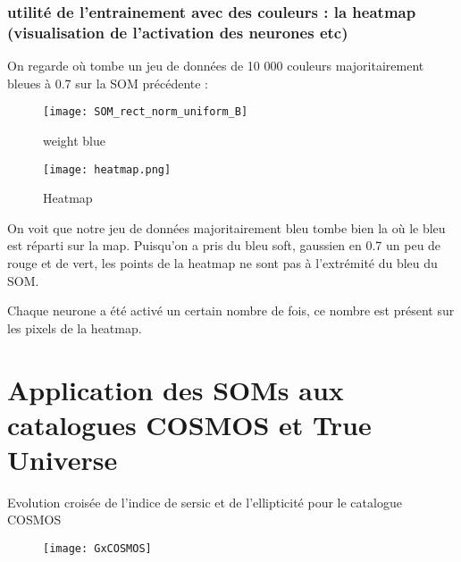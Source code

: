 \documentclass[12pt]{article}
\numberwithin{equation}{section} %
\begin{document}
\section{utilité de l'entrainement avec des couleurs : la heatmap (visualisation de l'activation des neurones etc)}


\noindent On regarde où tombe un jeu de données de 10 000 couleurs majoritairement bleues à 0.7 sur la SOM précédente :



\vspace{.5cm}
\begin{figure}[h!]
	\begin{minipage}[l]{.5\linewidth}
		\texttt{[image: SOM\_rect\_norm\_uniform\_B]}
		\caption{weight blue}
	\end{minipage}
	\begin{minipage}[r]{.5\linewidth}
		\texttt{[image: heatmap.png]}
		\caption{Heatmap }
	\end{minipage}
\end{figure}


On voit que notre jeu de données majoritairement bleu tombe bien la où le bleu est réparti sur la map.
Puisqu'on a pris du bleu soft, gaussien en 0.7 un peu de rouge et de vert, les points de la heatmap ne sont pas à l'extrémité du bleu du SOM.

Chaque neurone a été activé un certain nombre de fois, ce nombre est présent sur les pixels de la heatmap.




\newpage
\part{Application des SOMs aux catalogues COSMOS et True Universe}


\noindent Evolution croisée de l'indice de sersic et de l'ellipticité pour le catalogue COSMOS

\begin{figure*}[h!]
	\center
	\texttt{[image: GxCOSMOS]}
\end{figure*}
\end{document}
